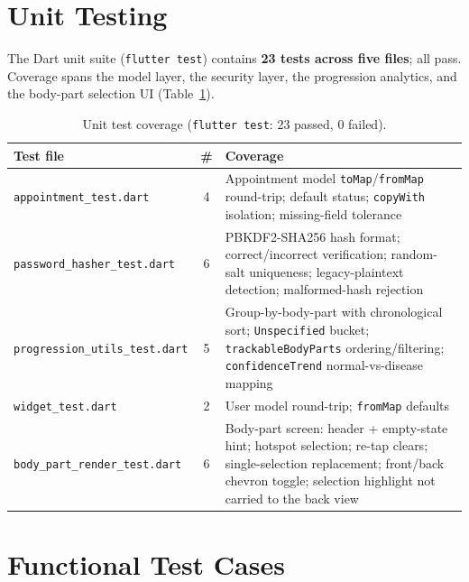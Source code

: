 \section{Unit Testing}

The Dart unit suite (\texttt{flutter test}) contains \textbf{23 tests across five
files}; all pass. Coverage spans the model layer, the security layer, the
progression analytics, and the body-part selection UI
(Table~\ref{tab:unit_tests}).

\begin{table}[H]
\centering
\caption{Unit test coverage (\texttt{flutter test}: 23 passed, 0 failed).}
\label{tab:unit_tests}
\begin{tabular}{|p{3.7cm}|c|p{7.3cm}|}
\hline
\textbf{Test file} & \textbf{\#} & \textbf{Coverage} \\ \hline
\texttt{appointment\_test.dart} & 4 & Appointment model \texttt{toMap}/\texttt{fromMap} round-trip; default status; \texttt{copyWith} isolation; missing-field tolerance \\ \hline
\texttt{password\_hasher\_test.dart} & 6 & PBKDF2-SHA256 hash format; correct/incorrect verification; random-salt uniqueness; legacy-plaintext detection; malformed-hash rejection \\ \hline
\texttt{progression\_utils\_test.dart} & 5 & Group-by-body-part with chronological sort; \texttt{Unspecified} bucket; \texttt{trackableBodyParts} ordering/filtering; \texttt{confidenceTrend} normal-vs-disease mapping \\ \hline
\texttt{widget\_test.dart} & 2 & User model round-trip; \texttt{fromMap} defaults \\ \hline
\texttt{body\_part\_render\_test.dart} & 6 & Body-part screen: header + empty-state hint; hotspot selection; re-tap clears; single-selection replacement; front/back chevron toggle; selection highlight not carried to the back view \\ \hline
\end{tabular}
\end{table}

\section{Functional Test Cases}


